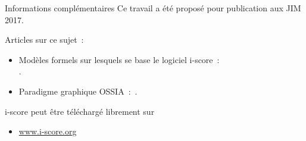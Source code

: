 \begin{block}{Informations complémentaires}
	Ce travail a été proposé pour publication aux JIM 2017.
      {Articles sur ce sujet~:
      \begin{itemize}
        \item Modèles formels sur lesquels se base le logiciel i-score~:~\\\cite{allombert_system_2007,arias2016authoring}.
        \item Paradigme graphique OSSIA~:~\cite{celerier2015ossia}.
      \end{itemize}
      \vspace{0.1in}\noindent i-score peut être téléchargé librement sur
      \begin{itemize}
        \item \url{www.i-score.org}
      \end{itemize}}
\end{block}